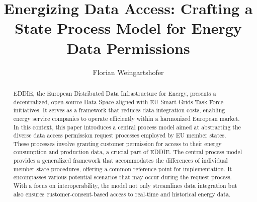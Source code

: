 \documentclass[sigconf]{acmart}
\begin{document}
    \title{Energizing Data Access: Crafting a State Process Model for Energy Data Permissions}

    \author{Florian Weingartshofer}

    \begin{abstract}
        EDDIE, the European Distributed Data Infrastructure for Energy, presents a decentralized, open-source Data Space aligned with EU Smart Grids Task Force initiatives.
        It serves as a framework that reduces data integration costs, enabling energy service companies to operate efficiently within a harmonized European market.
        In this context, this paper introduces a central process model aimed at abstracting the diverse data access permission request processes employed by EU member states.
        These processes involve granting customer permission for access to their energy consumption and production data, a crucial part of EDDIE\@.
        The central process model provides a generalized framework that accommodates the differences of individual member state procedures, offering a common reference point for implementation.
        It encompasses various potential scenarios that may occur during the request process.
        With a focus on interoperability, the model not only streamlines data integration but also ensures customer-consent-based access to real-time and historical energy data.
    \end{abstract}

    \maketitle

%    
%    
\end{document}
